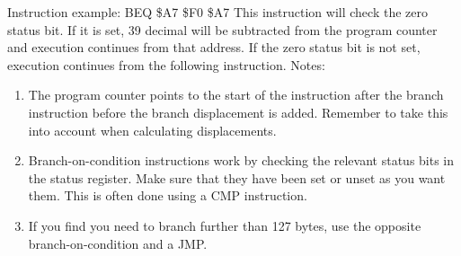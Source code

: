\documentclass{article}
\begin{document}
  Instruction example:
    BEQ \$A7
    \$F0 \$A7
  This instruction will check the zero status bit. If it is set, 39 decimal
  will be subtracted from the program counter and execution continues from
  that address. If the zero status bit is not set, execution continues from
  the following instruction.
  Notes:
  \begin{enumerate}
    \item The program counter points to the start of the instruction
  after the branch instruction before the branch displacement is added.
  Remember to take this into account when calculating displacements.
    \item Branch-on-condition instructions work by checking the relevant
  status bits in the status register. Make sure that they have been set or
  unset as you want them. This is often done using a CMP instruction.
    \item If you find you need to branch further than 127 bytes, use the
  opposite branch-on-condition and a JMP.
  \end{enumerate}
\end{document}
